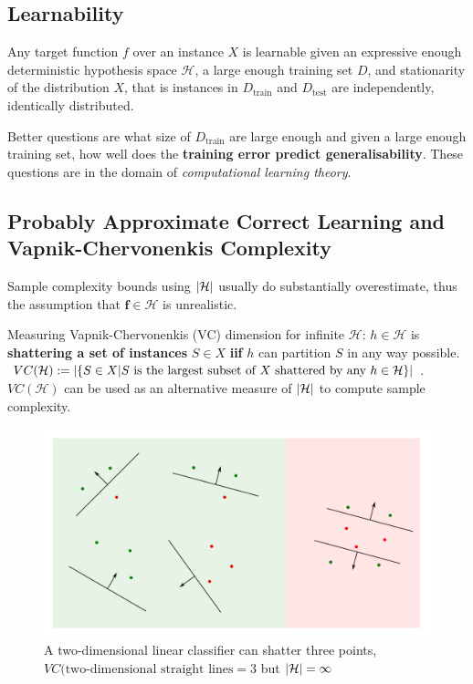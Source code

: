 \documentclass[11pt]{article}
\theoremstyle{definition}
\DeclarePairedDelimiter\abs{\lvert}{\rvert}
\begin{document}
\subsection{Learnability}
Any target function $f$ over an instance $X$ is learnable given an expressive enough deterministic hypothesis space $\mathcal{H}$, a large enough training set $D$, and stationarity of the distribution $X$, that is instances in $D_{\text{train}}$ and $D_{\text{test}}$ are independently, identically distributed.

Better questions are what size of \textbf{$D_{\text{train}}$} are large enough and given a large enough training set, how well does the \textbf{training error predict generalisability}. These questions are in the domain of \emph{computational learning theory}.

\subsection{Probably Approximate Correct Learning and Vapnik-Chervonenkis Complexity}
Sample complexity bounds using $\abs{\mathcal{H}}$ usually do substantially overestimate, thus the assumption that $\bm{f} \in \mathcal{H}$ is unrealistic.

Measuring Vapnik-Chervonenkis (VC) dimension for infinite $\mathcal{H}$:
$h\in\mathcal{H}$ is \textbf{shattering a set of instances} $S\in X$ \textbf{iif} $h$ can partition $S$ in any way possible.\\
$VC(\mathcal{H}) := \abs{\{S\in X | S \text{ is the largest subset of } X \text{ shattered by any } h\in\mathcal{H}\}}$. $VC(\mathcal{H})$ can be used as an alternative measure of $\abs{\mathcal{H}}$ to compute sample complexity.

\begin{figure}[H]
	\centering
	\includegraphics[keepaspectratio,width=0.9\linewidth]{VC_shattering}
	\caption{A two-dimensional linear classifier can shatter three points, $VC(\text{two-dimensional straight lines}=3$ but $\abs{\mathcal{H}} = \infty$}
\end{figure}
\end{document}
